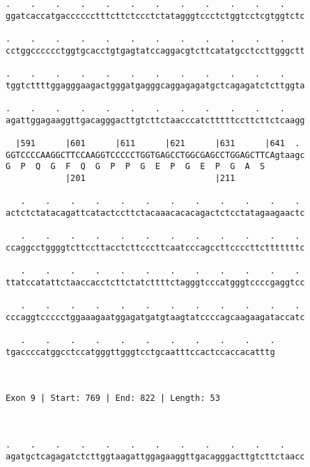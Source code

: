 \documentclass{article}
\begin{document}
\begin{Verbatim}
.    .    .    .    .    .    .    .    .    .    .    .    
ggatcaccatgacccccctttcttctccctctatagggtccctctggtcctcgtggtctc
                                                            
.    .    .    .    .    .    .    .    .    .    .    .    
cctggcccccctggtgcacctgtgagtatccaggacgtcttcatatgcctccttgggctt
                                                            
.    .    .    .    .    .    .    .    .    .    .    .    
tggtcttttggagggaagactgggatgagggcaggagagatgctcagagatctcttggta
                                                            
.    .    .    .    .    .    .    .    .    .    .    .    
agattggagaaggttgacagggacttgtcttctaacccatctttttccttcttctcaagg
                                                            
  |591      |601      |611      |621      |631      |641  . 
GGTCCCCAAGGCTTCCAAGGTCCCCCTGGTGAGCCTGGCGAGCCTGGAGCTTCAgtaagc
G  P  Q  G  F  Q  G  P  P  G  E  P  G  E  P  G  A  S        
            |201                          |211              
  
   .    .    .    .    .    .    .    .    .    .    .    . 
actctctatacagattcatactccttctacaaacacacagactctcctatagaagaactc
                                                            
   .    .    .    .    .    .    .    .    .    .    .    . 
ccaggcctggggtcttccttacctcttcccttcaatcccagccttccccttctttttttc
                                                            
   .    .    .    .    .    .    .    .    .    .    .    . 
ttatccatattctaaccacctcttctatcttttctagggtcccatgggtccccgaggtcc
                                                            
   .    .    .    .    .    .    .    .    .    .    .    . 
cccaggtccccctggaaagaatggagatgatgtaagtatccccagcaagaagataccatc
                                                            
   .    .    .    .    .    .    .    .    .    .    .
tgaccccatggcctccatgggttgggtcctgcaatttccactccaccacatttg
                                                      
                                                      
 
Exon 9 | Start: 769 | End: 822 | Length: 53



.    .    .    .    .    .    .    .    .    .    .    .    
agatgctcagagatctcttggtaagattggagaaggttgacagggacttgtcttctaacc
                                                            

\end{Verbatim}
\end{document}
